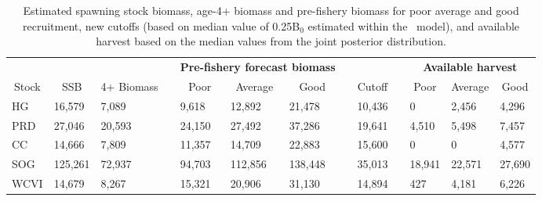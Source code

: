 %
\begin{table}[!tbp]
 \small
 \caption{Estimated spawning stock biomass,  
		age-4+ biomass and pre-fishery biomass 
		for poor average and good recruitment, 
		new cutoffs (based on median value of 0.25B$_0$
		estimated within the \iscam\ model), 
		and available harvest based on the median 
		values from the joint posterior distribution.\label{TableCatchAdviceNewCuttoffs}} 
 \begin{center}
 \begin{tabular}{lllclllclclll}\hline\hline
\multicolumn{3}{c}{\bfseries }&
\multicolumn{1}{c}{\bfseries }&
\multicolumn{3}{c}{\bfseries Pre-fishery forecast biomass}&
\multicolumn{1}{c}{\bfseries }&
\multicolumn{1}{c}{\bfseries }&
\multicolumn{1}{c}{\bfseries }&
\multicolumn{3}{c}{\bfseries Available harvest}
\tabularnewline \cline{1-13}
\multicolumn{1}{c}{Stock}&\multicolumn{1}{c}{SSB}&\multicolumn{1}{c}{4+ Biomass}&\multicolumn{1}{c}{}&\multicolumn{1}{c}{Poor}&\multicolumn{1}{c}{Average}&\multicolumn{1}{c}{Good}&\multicolumn{1}{c}{}&\multicolumn{1}{c}{Cutoff}&\multicolumn{1}{c}{}&\multicolumn{1}{c}{Poor}&\multicolumn{1}{c}{Average}&\multicolumn{1}{c}{Good}\tabularnewline
\hline
HG&16,579& 7,089&& 9,618&12,892&21,478&&10,436&&     0& 2,456& 4,296\tabularnewline
PRD&27,046&20,593&&24,150&27,492&37,286&&19,641&& 4,510& 5,498& 7,457\tabularnewline
CC&14,666& 7,809&&11,357&14,709&22,883&&15,600&&     0&     0& 4,577\tabularnewline
SOG&125,261& 72,937&& 94,703&112,856&138,448&& 35,013&& 18,941& 22,571& 27,690\tabularnewline
WCVI&14,679& 8,267&&15,321&20,906&31,130&&14,894&&   427& 4,181& 6,226\tabularnewline
\hline
\end{tabular}

\end{center}

\end{table}


